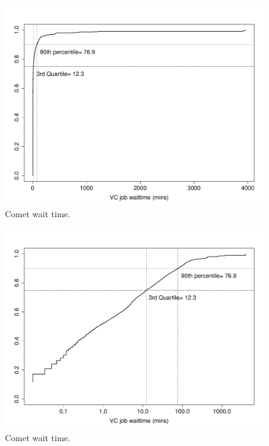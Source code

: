 \documentclass[sigconf,hyphens]{acmart}
\begin{document}
\begin{figure}[h]
  \centering

  \includegraphics[width=\linewidth]{images/vc_waittime_sum2.pdf}
  \caption{Comet wait time.}\label{fig:wait2}

\end{figure}

\begin{figure}[h]
  \centering

  \includegraphics[width=\linewidth]{images/vc_waittime_sum3.pdf}
  \caption{Comet wait time.}\label{fig:wait3}

\end{figure}
\end{document}
